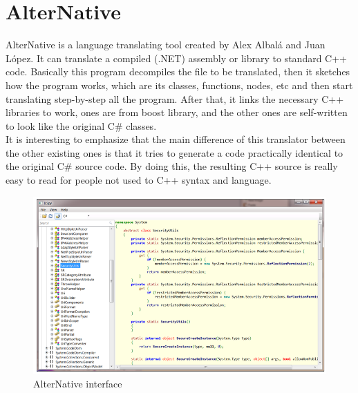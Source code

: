 \section{AlterNative}\label{S:Proposal-AlterNative}
AlterNative is a language translating tool created by Alex Albal\'{a} and Juan L\'{o}pez. It can translate a compiled (.NET) assembly or library to standard C++ code. Basically this program decompiles the file to be translated, then it sketches how the program works, which are its classes, functions, nodes, etc and then start translating step-by-step all the program. After that, it links the necessary C++ libraries to work, ones are from boost library, and the other ones are self-written to look like the original C\# classes.
\\
It is interesting to emphasize that the main difference of this translator between the other existing ones is that it tries to generate a code practically identical to the original C\# source code. By doing this, the resulting C++ source is really easy to read for people not used to C++ syntax and language.
\begin{figure}[H]\begin{center}
 \centering
  \captionsetup{justification=centering}
 \includegraphics[scale=0.65]{pictures/proposal/alternativeUI}
  \caption{AlterNative interface \label{fig:Proposal-AN}}
\end{center}\end{figure}

